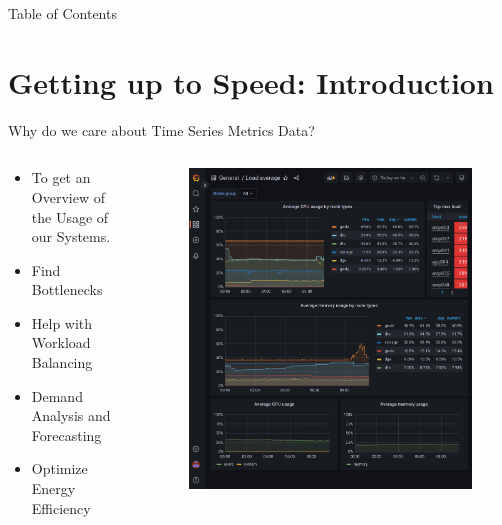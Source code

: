 \documentclass[compress,aspectratio=169]{beamer}
\begin{document}
\begin{frame}[plain]
	\titlepage
\end{frame}

\begin{frame}[t]{Table of Contents}
  \tableofcontents[subsectionstyle=hide/hide]
\end{frame}


\section[Introduction]{Getting up to Speed: Introduction}
\begin{frame}{Why do we care about Time Series Metrics Data?}
\begin{columns}[T]
\begin{column}{0.5\textwidth}
\begin{itemize}
  \item To get an Overview of the Usage of our Systems.
  \item Find Bottlenecks
  \item Help with Workload Balancing
  \item Demand Analysis and Forecasting
  \item Optimize Energy Efficiency
\end{itemize}
\end{column}
\begin{column}{0.5\textwidth}
\begin{figure}
  \includegraphics[height=.8\textheight]{example_grafana_dashboard.png}
\end{figure}
\end{column}
\end{columns}
\end{frame}
\end{document}
